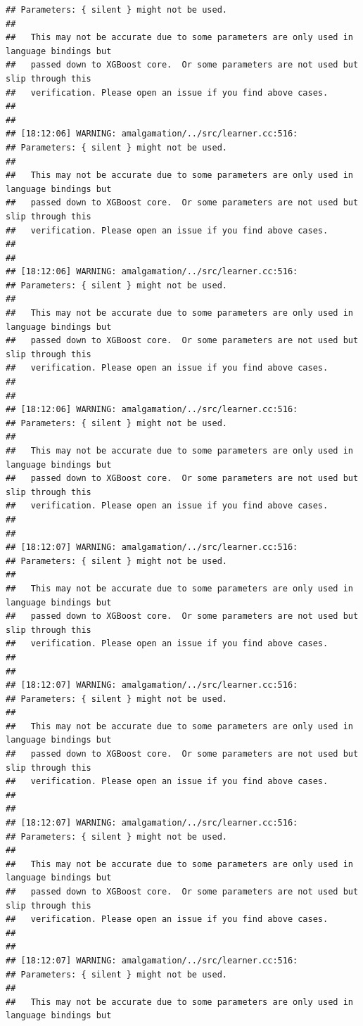 \documentclass[AMS,STIX2COL]{WileyNJD-v2}\usepackage[]{graphicx}\usepackage[]{color}
\makeatletter
\newenvironment{kframe}{%
 \def\at@end@of@kframe{}%
 \ifinner\ifhmode%
  \def\at@end@of@kframe{\end{minipage}}%
  \begin{minipage}{\columnwidth}%
 \fi\fi%
 \def\FrameCommand##1{\hskip\@totalleftmargin \hskip-\fboxsep
 \colorbox{shadecolor}{##1}\hskip-\fboxsep
     \hskip-\linewidth \hskip-\@totalleftmargin \hskip\columnwidth}%
 \MakeFramed {\advance\hsize-\width
   \@totalleftmargin\z@ \linewidth\hsize
   \@setminipage}}%
 {\par\unskip\endMakeFramed%
 \at@end@of@kframe}
\newenvironment{knitrout}{}{} %
\makeatother
\begin{document}
\begin{knitrout}
\begin{kframe}
\begin{verbatim}
## Parameters: { silent } might not be used.
## 
##   This may not be accurate due to some parameters are only used in language bindings but
##   passed down to XGBoost core.  Or some parameters are not used but slip through this
##   verification. Please open an issue if you find above cases.
## 
## 
## [18:12:06] WARNING: amalgamation/../src/learner.cc:516: 
## Parameters: { silent } might not be used.
## 
##   This may not be accurate due to some parameters are only used in language bindings but
##   passed down to XGBoost core.  Or some parameters are not used but slip through this
##   verification. Please open an issue if you find above cases.
## 
## 
## [18:12:06] WARNING: amalgamation/../src/learner.cc:516: 
## Parameters: { silent } might not be used.
## 
##   This may not be accurate due to some parameters are only used in language bindings but
##   passed down to XGBoost core.  Or some parameters are not used but slip through this
##   verification. Please open an issue if you find above cases.
## 
## 
## [18:12:06] WARNING: amalgamation/../src/learner.cc:516: 
## Parameters: { silent } might not be used.
## 
##   This may not be accurate due to some parameters are only used in language bindings but
##   passed down to XGBoost core.  Or some parameters are not used but slip through this
##   verification. Please open an issue if you find above cases.
## 
## 
## [18:12:07] WARNING: amalgamation/../src/learner.cc:516: 
## Parameters: { silent } might not be used.
## 
##   This may not be accurate due to some parameters are only used in language bindings but
##   passed down to XGBoost core.  Or some parameters are not used but slip through this
##   verification. Please open an issue if you find above cases.
## 
## 
## [18:12:07] WARNING: amalgamation/../src/learner.cc:516: 
## Parameters: { silent } might not be used.
## 
##   This may not be accurate due to some parameters are only used in language bindings but
##   passed down to XGBoost core.  Or some parameters are not used but slip through this
##   verification. Please open an issue if you find above cases.
## 
## 
## [18:12:07] WARNING: amalgamation/../src/learner.cc:516: 
## Parameters: { silent } might not be used.
## 
##   This may not be accurate due to some parameters are only used in language bindings but
##   passed down to XGBoost core.  Or some parameters are not used but slip through this
##   verification. Please open an issue if you find above cases.
## 
## 
## [18:12:07] WARNING: amalgamation/../src/learner.cc:516: 
## Parameters: { silent } might not be used.
## 
##   This may not be accurate due to some parameters are only used in language bindings but

\end{verbatim}
\end{kframe}
\end{knitrout}
\end{document}
